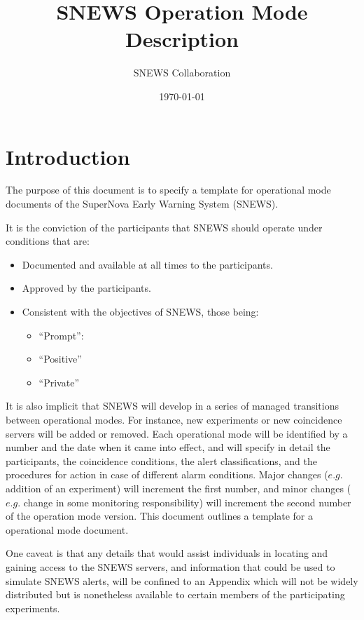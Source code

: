 \documentclass{article}
\begin{document}
\title{SNEWS Operation Mode Description}         
\author{SNEWS Collaboration}
\date{\today}
\maketitle

\section{Introduction}      
The purpose of this document is to specify a template for operational
mode documents of the SuperNova Early Warning System (SNEWS).

It is the conviction of the participants that SNEWS should operate
under conditions that are:

\begin{itemize}
\item Documented and available at all times to the participants.
\item Approved by the participants.
\item Consistent with the objectives of SNEWS, those being:
\begin{itemize}
\item ``Prompt'':
\item ``Positive''
\item ``Private''
\end{itemize}
\end{itemize}

It is also implicit that SNEWS will develop in a series of managed
transitions between operational modes. For instance, new experiments
or new coincidence servers will be added or removed.  Each operational
mode will be identified by a number and the date when it came into
effect, and will specify in detail the participants, the coincidence
conditions, the alert classifications, and the procedures for action
in case of different alarm conditions.  Major changes ($e.g.$ addition
of an experiment) will increment the first number, and minor changes
($e.g.$ change in some monitoring responsibility) will increment the
second number of the operation mode version.  This document outlines a
template for a operational mode document.

One caveat is that any details that would assist individuals in locating
and gaining access to the SNEWS servers, and information that could be
used to simulate SNEWS alerts, will be confined to an Appendix which
will not be widely distributed but is nonetheless available to certain
members of the participating experiments.
\end{document}
